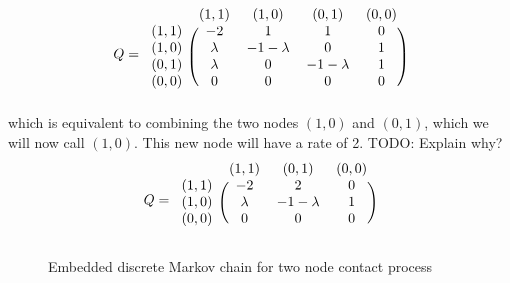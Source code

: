 \documentclass{article}
\theoremstyle{plain}
\theoremstyle{definition}
\theoremstyle{remark}
\begin{document}
$$
Q = \begin{blockarray}{ccccc}
    & (1,1) & (1,0) & (0,1) & (0,0)\\
    \begin{block}{c(cccc)}
        (1,1) & -2 & 1 & 1 & 0\\
        (1,0) & \lambda & - 1 - \lambda & 0 & 1\\
        (0,1) & \lambda & 0 & - 1 - \lambda & 1\\
        (0,0) & 0 & 0 & 0 & 0\\
    \end{block}
\end{blockarray}
$$
which is equivalent to combining the two nodes $(1,0)$ and $(0,1)$, which we will now call $(1,0)$.
This new node will have a rate of 2. TODO: Explain why?
$$
Q = \begin{blockarray}{cccc}
    & (1,1) & (0,1) & (0,0)\\
    \begin{block}{c(ccc)}
        (1,1) & -2 & 2 & 0\\
        (1,0) & \lambda & - 1 - \lambda & 1\\
        (0,0) & 0 & 0 & 0\\
    \end{block}
\end{blockarray}
$$


\begin{figure}
    \centering
    \caption{Embedded discrete Markov chain for two node contact process}
    \label{fig:discrete_mc_two_contact}
\end{figure}
\end{document}
